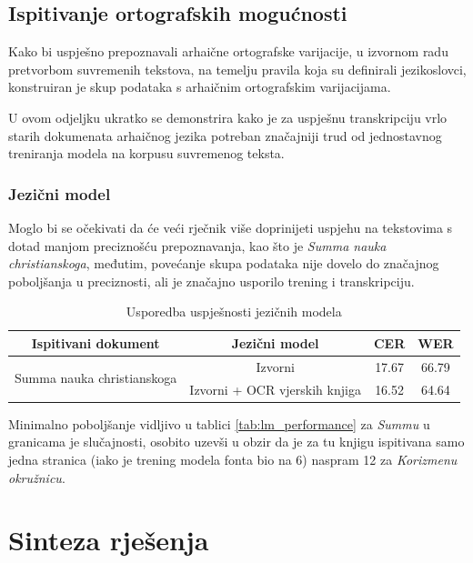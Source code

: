 \documentclass[zavrsnirad]{fer}
\begin{document}
\section{Ispitivanje ortografskih mogućnosti}

Kako bi uspješno prepoznavali arhaične ortografske varijacije, u izvornom radu \cite{Garrette2016} pretvorbom suvremenih tekstova, na temelju pravila koja su definirali jezikoslovci, konstruiran je skup podataka s arhaičnim ortografskim varijacijama.

U ovom odjeljku ukratko se demonstrira kako je za uspješnu transkripciju vrlo starih dokumenata arhaičnog jezika potreban značajniji trud od jednostavnog treniranja modela na korpusu suvremenog teksta.


\subsection{Jezični model}

Moglo bi se očekivati da će veći rječnik više doprinijeti uspjehu na tekstovima s dotad manjom preciznošću prepoznavanja, kao što je \textit{Summa nauka christianskoga}, međutim, povećanje skupa podataka nije dovelo do značajnog poboljšanja u preciznosti, ali je značajno usporilo trening i transkripciju.

\bgroup
\def\arraystretch{1.25}
\begin{table}[h]
	\centering
	\begin{tabular}{|c|c|c|c|}
		\hline
		\textbf{Ispitivani dokument} & \textbf{Jezični model} & \textbf{CER} & \textbf{WER} \\ \hline
		\multirow{2}{*}{Summa nauka christianskoga} & Izvorni & 17.67 & 66.79 \\ \cline{2-4}
		& Izvorni + OCR vjerskih knjiga & 16.52 & 64.64 \\ \hline
	\end{tabular}
	\caption{Usporedba uspješnosti jezičnih modela}
	\label{tab:ortography_performance}
\end{table}
\egroup

Minimalno poboljšanje vidljivo u tablici \ref{tab:lm_performance} za \textit{Summu} u granicama je slučajnosti, osobito uzevši u obzir da je za tu knjigu ispitivana samo jedna stranica (iako je trening modela fonta bio na 6) naspram 12 za \textit{Korizmenu okružnicu}.

\chapter{Sinteza rješenja}
\label{pog:sinteza_rješenja}
\end{document}
